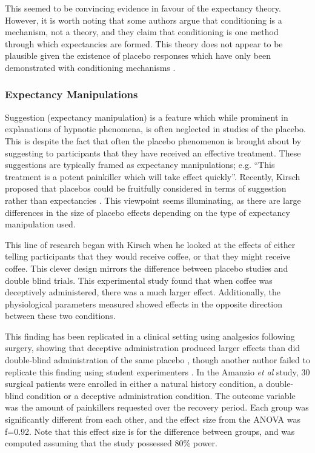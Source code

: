 This seemed to be convincing evidence in favour of the expectancy theory. However, it is worth noting that some authors \cite{Stewart-Williams2004a}  argue that conditioning is a mechanism, not a theory, and they claim that conditioning is one method through which expectancies are formed. This theory does not appear to be plausible given the existence of placebo responses which have only been demonstrated with conditioning mechanisms \cite{benedetti2003a}.   

\subsubsection{Expectancy Manipulations}
\label{sec:suggestion}

Suggestion (expectancy manipulation) is a feature which while prominent in explanations of hypnotic phenomena, is often neglected in studies of the placebo. This is despite the fact that often the placebo phenomenon is brought about by suggesting to participants that they have received an effective treatment. These suggestions are typically framed as expectancy manipulations; e.g. ``This treatment is a potent painkiller which will take effect quickly''. Recently, Kirsch proposed that placebos could be fruitfully considered in terms of suggestion rather than expectancies  \cite{Kirsch1999}. This viewpoint seems illuminating, as there are large differences in the size of placebo effects depending on the type of expectancy manipulation used. 

This line of research began with Kirsch \cite{kirsch1988double} when he looked at the effects of either telling participants that they would receive coffee, or that they might receive coffee. This clever design  mirrors the difference between placebo studies and double blind trials. This experimental study found that when coffee was deceptively administered, there was a much larger effect. Additionally, the physiological parameters measured showed effects in the opposite direction between these two conditions.  

This finding has been replicated in a clinical setting using analgesics following surgery, showing that deceptive administration produced larger effects than did double-blind administration of the same placebo \cite{Amanzio2001}, though another author failed to replicate this finding using student experimenters \cite{Walach2002}. In the Amanzio {\it et al} study, 30 surgical patients were enrolled in either a natural history condition, a double-blind condition or a deceptive administration condition. The outcome variable was the amount of painkillers requested over the recovery period. Each group was significantly different from each other, and the effect size from the ANOVA was f=0.92. Note that this effect size is for the difference between groups, and was computed assuming that the study possessed 80\% power. 

